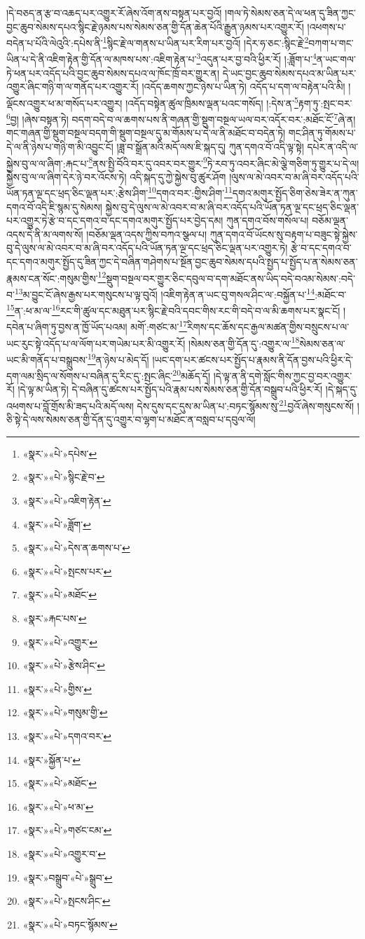 །དེ་བཅད་ན་རྩ་བ་འཆད་པར་འགྱུར་རོ་ཞེས་འོག་ནས་བསྟན་པར་བྱའོ། །གལ་ཏེ་སེམས་ཅན་དེ་ལ་ཕན་དུ་ཟིན་ཀྱང་བྱང་ཆུབ་སེམས་དཔའ་སྙིང་རྗེ་ཉམས་པས་སེམས་ཅན་གྱི་དོན་ཆེན་པོའི་རྒྱུན་ཉམས་པར་འགྱུར་རོ། །འཕགས་པ་བདེན་པ་པོའི་ལེའུའི་:དཔེས་ནི་\footnote{«སྣར་»«པེ་»དཔེས་}སྙིང་རྗེ་ལ་གནས་པ་ཡིན་པར་རིག་པར་བྱའོ། །དེར་ཧ་ཅང་:སྙིང་རྗེ་\footnote{«སྣར་»«པེ་»སྙིང་རྗེ་བ་}བཀག་པ་གང་ཡིན་པ་དེ་ནི་འཇིག་རྟེན་གྱི་དོན་ལ་མཁས་པས་:འཇིག་རྟེན་པ་\footnote{«སྣར་»«པེ་»འཇིག་རྟེན་}འདུན་པར་བྱ་བའི་ཕྱིར་རོ། །:ཟློག་པ་\footnote{«སྣར་»«པེ་»ཟློག་}ན་ཡང་གལ་ཏེ་ཕན་པར་འདོད་པའི་བྱང་ཆུབ་སེམས་དཔའ་ལ་ཁོང་ཁྲོ་བར་གྱུར་ན། དེ་ཡང་བྱང་ཆུབ་སེམས་དཔའ་མ་ཡིན་པར་འགྱུར་ཞིང་གཉི་ག་ལ་གནོད་པར་འགྱུར་རོ། །འདོད་ཆགས་ཀྱང་ཉེས་པ་ཡིན་ཏེ། འདོད་པ་དག་ལ་བརྟེན་པའི་མི། །ལྡོངས་འགྱུར་ཕ་མ་གསོད་པར་འགྱུར། །འདོད་བསྟེན་ཚུལ་ཁྲིམས་ལྡན་པའང་གསོད། །:དེས་ན་\footnote{«སྣར་»«པེ་»དེས་ན་ཆགས་པ་}རྟག་ཏུ་:སྤང་བར་\footnote{«སྣར་»«པེ་»སྤངས་པར་}བྱ། །ཞེས་བསྟན་ཏེ། བདག་བདེ་བ་ལ་ཆགས་པས་ནི་གཞན་གྱི་སྡུག་བསྔལ་ཡལ་བར་འདོར་བར་:མཐོང་ངོ་\footnote{«སྣར་»«པེ་»མཐོང་}ཞེ་ན། གང་གཞན་གྱི་སྡུག་བསྔལ་བདག་གི་སྡུག་བསྔལ་དུ་མ་གོམས་པ་དེ་ལ་ནི་མཐོང་བ་བདེན་ཏེ། གང་ཤིན་ཏུ་གོམས་པ་དེ་ལ་ནི་ཉེས་པ་གཉི་ག་མི་འབྱུང་ངོ། །ཟླ་བ་སྒྲོན་མའི་མདོ་ལས་ཇི་སྐད་དུ། ཀུན་དགའ་བོ་འདི་ལྟ་སྟེ། དཔེར་ན་འདི་ལ་སྐྱེས་བུ་ལ་ལ་ཞིག་:རྐང་པ་\footnote{«སྣར་»རྐང་པས་}ནས་སྤྱི་བོའི་བར་དུ་འབར་བར་གྱུར་\footnote{«སྣར་»«པེ་»འགྱུར་}ཏེ་རབ་ཏུ་འབར་ཞིང་མེ་ལྕེ་གཅིག་ཏུ་གྱུར་པ་དེ་ལ། སྐྱེས་བུ་ལ་ལ་ཞིག་དེར་ཉེ་བར་འོངས་ཏེ། འདི་སྐད་དུ་ཀྱེ་སྐྱེས་བུ་ཚུར་ཤོག །ལུས་ལ་མེ་འབར་བ་མ་ཞི་བར་འདོད་པའི་ཡོན་ཏན་ལྔ་དང་ཕྲད་ཅིང་ལྡན་པར་:རྩེས་ཤིག་\footnote{«སྣར་»«པེ་»རྩེས་ཤིང་}དགའ་བར་:གྱིས་ཤིག་\footnote{«སྣར་»«པེ་»གྱིས་}དགའ་མགུར་སྤྱོད་ཅིག་ཅེས་ཟེར་ན་ཀུན་དགའ་བོ་འདི་ཇི་སྙམ་དུ་སེམས། སྐྱེས་བུ་དེ་ལུས་ལ་མེ་འབར་བ་མ་ཞི་བར་འདོད་པའི་ཡོན་ཏན་ལྔ་དང་ཕྲད་ཅིང་ལྡན་པར་འགྱུར་ཏེ་རྩེ་བ་དང་དགའ་བ་དང་དགའ་མགུར་སྤྱོད་པར་བྱེད་དམ། ཀུན་དགའ་བོས་གསོལ་པ། བཅོམ་ལྡན་འདས་དེ་ནི་མ་ལགས་སོ། །བཅོམ་ལྡན་འདས་ཀྱིས་བཀའ་སྩལ་པ། ཀུན་དགའ་བོ་ཡོངས་སུ་བརྟག་པ་བཟུང་སྟེ་སྐྱེས་བུ་དེ་ལུས་ལ་མེ་འབར་བ་མ་ཞི་བར་འདོད་པའི་ཡོན་ཏན་ལྔ་དང་ཕྲད་ཅིང་ལྡན་པར་འགྱུར་ཏེ། རྩེ་བ་དང་དགའ་བ་དང་དགའ་མགུར་སྤྱོད་དུ་ཟིན་ཀྱང་དེ་བཞིན་གཤེགས་པ་སྔོན་བྱང་ཆུབ་སེམས་དཔའི་སྤྱད་པ་སྤྱོད་པ་ན་སེམས་ཅན་རྣམས་ངན་སོང་:གསུམ་གྱིས་\footnote{«སྣར་»«པེ་»གསུམ་གྱི་}སྡུག་བསྔལ་བར་གྱུར་ཅིང་དབུལ་བ་དག་མཐོང་ནས་ཡིད་བདེ་བའམ་སེམས་:བདེ་བ་\footnote{«སྣར་»«པེ་»དགའ་བར་}མ་བྱུང་ངོ་ཞེས་རྒྱས་པར་གསུངས་པ་ལྟ་བུའོ། །འཇིག་རྟེན་ན་ཡང་བུ་གསལ་ཤིང་ལ་:བསྐྱོན་པ་\footnote{«སྣར་»སྐྱོན་པ་}:མཐོང་བ་\footnote{«སྣར་»«པེ་»མཐོང་}ན་:ཕ་མ་ལ་\footnote{«སྣར་»«པེ་»ཕ་མ་}རང་གི་ཚུལ་དང་མཐུན་པར་སྙིང་རྗེ་བའི་དབང་གིས་རང་གི་བདེ་བ་ལ་མི་ཆགས་པར་སྣང་ངོ། །དབེན་པ་ཞིག་ཏུ་བྱས་ན་ཁྱོ་ཡོད་པའམ། མགོ་:གཙང་མ་\footnote{«སྣར་»«པེ་»གཙང་ངམ་}རིགས་དང་ཆོས་དང་རྒྱལ་མཚན་གྱིས་བསྲུངས་པ་ལ་ཡང་རུང་སྟེ་འདོད་པ་ལ་ལོག་པར་གཡེམ་པར་མི་འགྱུར་རོ། །སེམས་ཅན་གྱི་དོན་དུ་:འགྱུར་ལ་\footnote{«སྣར་»«པེ་»འགྱུར་བ་}སེམས་ཅན་ལ་ཡང་མི་གནོད་པ་བསྒྲུབས་\footnote{«སྣར་»བསྒྲུབ་«པེ་»སྒྲུབ་}ན་ཉེས་པ་མེད་དོ། །ཡང་དག་པར་ཚངས་པར་སྤྱོད་པ་རྣམས་ནི་དོན་བྱས་པའི་ཕྱིར་དེ་དག་ལམ་སྲིད་ལ་སོགས་པ་བཞིན་དུ་རིང་དུ་:སྤང་ཞིང་\footnote{«སྣར་»«པེ་»སྤངས་ཤིང་}མཆོད་དོ། །དེ་ལྟ་ན་ནི་དགེ་སློང་གིས་ཀྱང་བྱ་བར་འགྱུར་རོ། །དེ་ལྟ་མ་ཡིན་ཏེ། དེ་བཞིན་དུ་ཚངས་པར་སྤྱོད་པའི་རྣམ་པས་སེམས་ཅན་གྱི་དོན་བསྒྲུབ་པའི་ཕྱིར་རོ། །དེ་སྐད་དུ་འཕགས་པ་བློ་གྲོས་མི་ཟད་པའི་མདོ་ལས། དེས་དུས་དང་དུས་མ་ཡིན་པ་:བཏང་སྙོམས་སུ་\footnote{«སྣར་»«པེ་»བཏང་སྙོམས་}བྱའོ་ཞེས་གསུངས་སོ། །ཅི་སྟེ་དེ་ལས་སེམས་ཅན་གྱི་དོན་དུ་འགྱུར་བ་ལྷག་པ་མཐོང་ན་བསླབ་པ་དབུལ་ལོ། 
